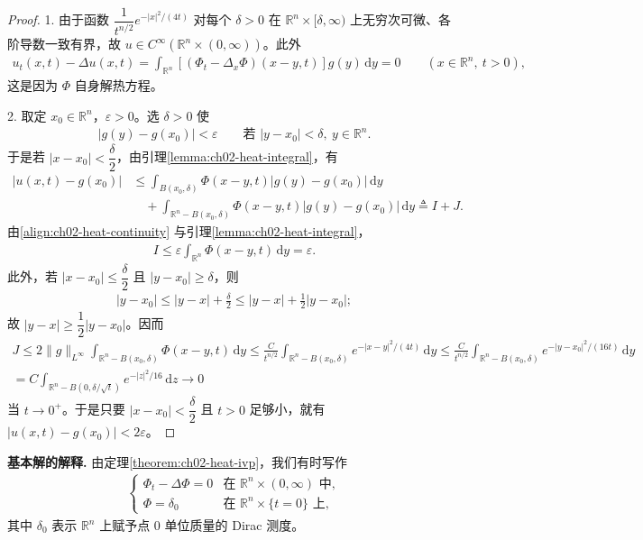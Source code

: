\documentclass[../../main.tex]{subfiles}
\begin{document}
\begin{proof}
1. 由于函数 $\dfrac{1}{t^{n/2}}e^{-|x|^2/(4t)}$ 对每个 $\delta>0$ 在 $\mathbb{R}^n\times[\delta,\infty)$ 上无穷次可微、各阶导数一致有界，故 $u\in C^\infty(\mathbb{R}^n\times(0,\infty))$。此外
\begin{align}\label{align:ch02-heat-ivp-check}
u_t(x,t)-\Delta u(x,t)=\int_{\mathbb{R}^n}[(\Phi_t-\Delta_x\Phi)(x-y,t)]g(y)\,\mathrm{d}y=0 \qquad (x\in\mathbb{R}^n,\ t>0),
\end{align}
这是因为 $\Phi$ 自身解热方程。

2. 取定 $x_0\in\mathbb{R}^n$，$\varepsilon>0$。选 $\delta>0$ 使
\begin{align}\label{align:ch02-heat-continuity}
|g(y)-g(x_0)|<\varepsilon \qquad \text{若 }|y-x_0|<\delta,\ y\in\mathbb{R}^n.
\end{align}
于是若 $|x-x_0|<\dfrac{\delta}{2}$，由引理\cref{lemma:ch02-heat-integral}，有
\begin{align*}
|u(x,t)-g(x_0)|&\leqslant\int_{B(x_0,\delta)}\Phi(x-y,t)|g(y)-g(x_0)|\,\mathrm{d}y\\
&\quad+\int_{\mathbb{R}^n-B(x_0,\delta)}\Phi(x-y,t)|g(y)-g(x_0)|\,\mathrm{d}y\triangleq I+J.
\end{align*}
由\eqref{align:ch02-heat-continuity} 与引理\cref{lemma:ch02-heat-integral}，
\begin{align*}
I\leqslant\varepsilon\int_{\mathbb{R}^n}\Phi(x-y,t)\,\mathrm{d}y=\varepsilon.
\end{align*}
此外，若 $|x-x_0|\leqslant\dfrac{\delta}{2}$ 且 $|y-x_0|\geqslant\delta$，则
\begin{align*}
|y-x_0|\leqslant|y-x|+\frac{\delta}{2}\leqslant|y-x|+\frac{1}{2}|y-x_0|;
\end{align*}
故 $|y-x|\geqslant\dfrac{1}{2}|y-x_0|$。因而
\begin{align*}
J\leqslant 2\|g\|_{L^\infty}\int_{\mathbb{R}^n-B(x_0,\delta)}\Phi(x-y,t)\,\mathrm{d}y
\leqslant\frac{C}{t^{n/2}}\int_{\mathbb{R}^n-B(x_0,\delta)}e^{-|x-y|^2/(4t)}\,\mathrm{d}y
\leqslant\frac{C}{t^{n/2}}\int_{\mathbb{R}^n-B(x_0,\delta)}e^{-|y-x_0|^2/(16t)}\,\mathrm{d}y\\
=C\int_{\mathbb{R}^n-B(0,\delta/\sqrt{t})}e^{-|z|^2/16}\,\mathrm{d}z\to 0
\end{align*}
当 $t\to 0^+$。于是只要 $|x-x_0|<\dfrac{\delta}{2}$ 且 $t>0$ 足够小，就有 $|u(x,t)-g(x_0)|<2\varepsilon$。
\end{proof}

\textbf{基本解的解释.} 由定理\cref{theorem:ch02-heat-ivp}，我们有时写作
\begin{align*}
\begin{cases}
\Phi_t-\Delta\Phi=0 & \text{在 }\mathbb{R}^n\times(0,\infty)\text{ 中},\\
\Phi=\delta_0 & \text{在 }\mathbb{R}^n\times\{t=0\}\text{ 上},
\end{cases}
\end{align*}
其中 $\delta_0$ 表示 $\mathbb{R}^n$ 上赋予点 $0$ 单位质量的 Dirac 测度。
\end{document}
